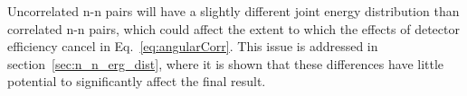 
Uncorrelated n-n pairs will have a slightly different joint energy distribution than correlated n-n pairs, which could affect the extent to which the effects of detector efficiency cancel in Eq.~\ref{eq:angularCorr}. 
This issue is addressed in section~\ref{sec:n_n_erg_dist}, where it is shown that these differences have little potential to significantly affect the final result.

